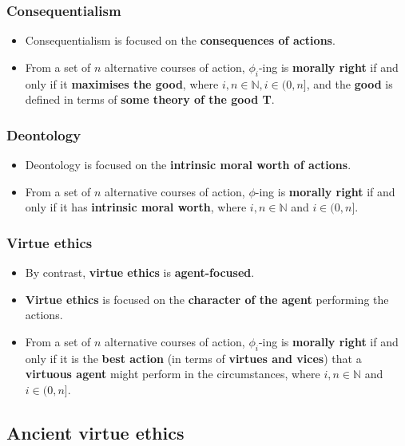 \documentclass[11pt]{article}
\begin{document}
\subsubsection{Consequentialism}
\label{sec:orge4a44e4}
\begin{itemize}
\item Consequentialism is focused on the \textbf{consequences of actions}.
\item From a set of \(n\) alternative courses of action, \(\phi_i\)-ing is \textbf{morally right} if and only if it \textbf{maximises the good}, where \(i, n \in \mathbb{N}, i \in (0, n]\), and the \textbf{good} is defined in terms of \textbf{some theory of the good T}.
\end{itemize}
\subsubsection{Deontology}
\label{sec:org563b82a}
\begin{itemize}
\item Deontology is focused on the \textbf{intrinsic moral worth of actions}.
\item From a set of \(n\) alternative courses of action, \(\phi\)-ing is \textbf{morally right} if and only if it has \textbf{intrinsic moral worth}, where \(i, n \in \mathbb{N}\) and \(i \in (0, n]\).
\end{itemize}
\subsubsection{Virtue ethics}
\label{sec:orgb7125b0}
\begin{itemize}
\item By contrast, \textbf{virtue ethics} is \textbf{agent-focused}.
\item \textbf{Virtue ethics} is focused on the \textbf{character of the agent} performing the actions.
\item From a set of \(n\) alternative courses of action, \(\phi_i\)-ing is \textbf{morally right} if and only if it is the \textbf{best action} (in terms of \textbf{virtues and vices}) that a \textbf{virtuous agent} might perform in the circumstances, where \(i, n \in \mathbb{N}\) and \(i \in (0, n]\).
\end{itemize}
\subsection{Ancient virtue ethics}
\label{sec:org79682f3}
\end{document}
